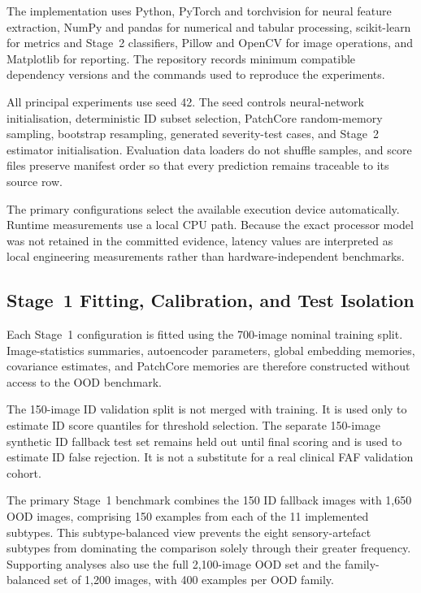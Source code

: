 \documentclass[fleqn,12pt]{olplainarticle}
\begin{document}
The implementation uses Python, PyTorch and torchvision for neural feature
extraction, NumPy and pandas for numerical and tabular processing,
scikit-learn for metrics and Stage~2 classifiers, Pillow and OpenCV for image
operations, and Matplotlib for reporting. The repository records minimum
compatible dependency versions and the commands used to reproduce the
experiments.

All principal experiments use seed 42. The seed controls neural-network
initialisation, deterministic ID subset selection, PatchCore random-memory
sampling, bootstrap resampling, generated severity-test cases, and Stage~2
estimator initialisation. Evaluation data loaders do not shuffle samples, and
score files preserve manifest order so that every prediction remains
traceable to its source row.

The primary configurations select the available execution device
automatically. Runtime measurements use a local CPU path. Because the exact
processor model was not retained in the committed evidence, latency values
are interpreted as local engineering measurements rather than
hardware-independent benchmarks.

\subsection{Stage~1 Fitting, Calibration, and Test Isolation}
\label{subsec:stage1_fitting_calibration}

Each Stage~1 configuration is fitted using the 700-image nominal training
split. Image-statistics summaries, autoencoder parameters, global embedding
memories, covariance estimates, and PatchCore memories are therefore
constructed without access to the OOD benchmark.

The 150-image ID validation split is not merged with training. It is used only
to estimate ID score quantiles for threshold selection. The separate
150-image synthetic ID fallback test set remains held out until final scoring
and is used to estimate ID false rejection. It is not a substitute for a real
clinical FAF validation cohort.

The primary Stage~1 benchmark combines the 150 ID fallback images with 1,650
OOD images, comprising 150 examples from each of the 11 implemented subtypes.
This subtype-balanced view prevents the eight sensory-artefact subtypes from
dominating the comparison solely through their greater frequency. Supporting
analyses also use the full 2,100-image OOD set and the family-balanced set of
1,200 images, with 400 examples per OOD family.
\end{document}
